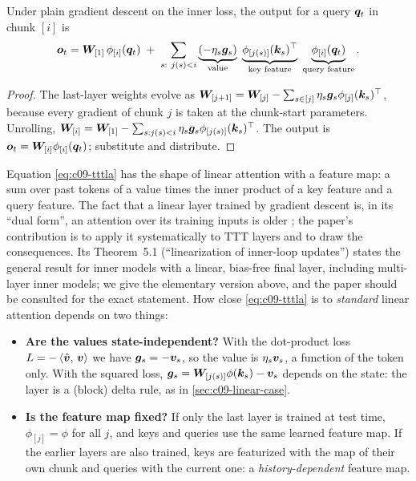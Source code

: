 \begin{proposition}\label{prop:c09-tttla}
Under plain gradient descent on the inner loss, the output for a query $\bm{q}_t$ in chunk $[i]$ is
\begin{equation}\label{eq:c09-tttla}
  \bm{o}_t = \bm{W}_{[1]}\,\phi_{[i]}(\bm{q}_t) \;+\; \sum_{s:\ j(s) < i}
     \underbrace{(-\eta_s\bm{g}_s)}_{\text{value}}\;
     \underbrace{\phi_{[j(s)]}(\bm{k}_s)^{\top}}_{\text{key feature}}\;
     \underbrace{\phi_{[i]}(\bm{q}_t)}_{\text{query feature}} .
\end{equation}
\end{proposition}
\begin{proof}
The last-layer weights evolve as $\bm{W}_{[j+1]} = \bm{W}_{[j]} - \sum_{s\in[j]}\eta_s\bm{g}_s\phi_{[j]}(\bm{k}_s)^{\top}$,
because every gradient of chunk $j$ is taken at the chunk-start parameters. Unrolling,
$\bm{W}_{[i]} = \bm{W}_{[1]} - \sum_{s: j(s)<i}\eta_s\bm{g}_s\phi_{[j(s)]}(\bm{k}_s)^{\top}$. The output is
$\bm{o}_t = \bm{W}_{[i]}\phi_{[i]}(\bm{q}_t)$; substitute and distribute.
\end{proof}

Equation \eqref{eq:c09-tttla} has the shape of linear attention with a feature map: a sum over
past tokens of a value times the inner product of a key feature and a query feature. The fact
that a linear layer trained by gradient descent is, in its ``dual form'', an attention over its
training inputs is older \citep{c09-irie2022dual}; the paper's contribution is to apply it
systematically to TTT layers and to draw the consequences. Its Theorem~5.1 (``linearization of
inner-loop updates'') states the general result for inner models with a linear, bias-free final
layer, including multi-layer inner models; we give the elementary version above, and the paper
should be consulted for the exact statement. How close \eqref{eq:c09-tttla} is to \emph{standard}
linear attention depends on two things:
\begin{itemize}
  \item \textbf{Are the values state-independent?} With the dot-product loss
        $L = -\left\langle \hat{\bm{v}},\, \bm{v}\right\rangle$ we have $\bm{g}_s = -\bm{v}_s$, so the value is $\eta_s\bm{v}_s$,
        a function of the token only. With the squared loss, $\bm{g}_s = \bm{W}_{[j(s)]}\phi(\bm{k}_s) -
        \bm{v}_s$ depends on the state: the layer is a (block) delta rule, as in
        \cref{sec:c09-linear-case}.
  \item \textbf{Is the feature map fixed?} If only the last layer is trained at test time,
        $\phi_{[j]} = \phi$ for all $j$, and keys and queries use the same learned feature map.
        If the earlier layers are also trained, keys are featurized with the map of their own
        chunk and queries with the current one: a \emph{history-dependent} feature map.
\end{itemize}


